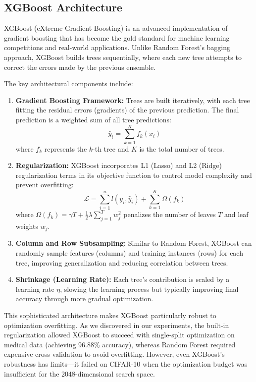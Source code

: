 \documentclass[12pt, a4paper]{article}
\begin{document}
\subsection{XGBoost Architecture}
XGBoost (eXtreme Gradient Boosting) is an advanced implementation of gradient boosting that has become the gold standard for machine learning competitions and real-world applications. Unlike Random Forest's bagging approach, XGBoost builds trees sequentially, where each new tree attempts to correct the errors made by the previous ensemble. 

The key architectural components include:
\begin{enumerate}
    \item \textbf{Gradient Boosting Framework:} Trees are built iteratively, with each tree fitting the residual errors (gradients) of the previous prediction. The final prediction is a weighted sum of all tree predictions:
    \begin{equation}
        \hat{y}_i = \sum_{k=1}^{K} f_k(x_i)
    \end{equation}
    where $f_k$ represents the $k$-th tree and $K$ is the total number of trees.
    
    \item \textbf{Regularization:} XGBoost incorporates L1 (Lasso) and L2 (Ridge) regularization terms in its objective function to control model complexity and prevent overfitting:
    \begin{equation}
        \mathcal{L} = \sum_{i=1}^{n} l(y_i, \hat{y}_i) + \sum_{k=1}^{K} \Omega(f_k)
    \end{equation}
    where $\Omega(f_k) = \gamma T + \frac{1}{2}\lambda \sum_{j=1}^{T} w_j^2$ penalizes the number of leaves $T$ and leaf weights $w_j$.
    
    \item \textbf{Column and Row Subsampling:} Similar to Random Forest, XGBoost can randomly sample features (columns) and training instances (rows) for each tree, improving generalization and reducing correlation between trees.
    
    \item \textbf{Shrinkage (Learning Rate):} Each tree's contribution is scaled by a learning rate $\eta$, slowing the learning process but typically improving final accuracy through more gradual optimization.
\end{enumerate}

This sophisticated architecture makes XGBoost particularly robust to optimization overfitting. As we discovered in our experiments, the built-in regularization allowed XGBoost to succeed with single-split optimization on medical data (achieving 96.88\% accuracy), whereas Random Forest required expensive cross-validation to avoid overfitting. However, even XGBoost's robustness has limits—it failed on CIFAR-10 when the optimization budget was insufficient for the 2048-dimensional search space.
\end{document}
